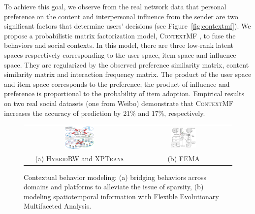 \documentclass[10.5pt]{article}
\begin{document}
To achieve this goal, we observe from the real network data that personal preference on the content and interpersonal influence from the sender are two significant factors that determine users' decisions (see Figure~\ref{fig:contextmf}). We propose a probabilistic matrix factorization model, \textsc{ContextMF} \cite{jiang2012socialcontextual}, to fuse the behaviors and social contexts. In this model, there are three low-rank latent spaces respectively corresponding to the user space, item space and influence space. They are regularized by the observed preference similarity matrix, content similarity matrix and interaction frequency matrix. The product of the user space and item space corresponds to the preference; the product of influence and preference is proportional to the probability of item adoption. Empirical results on two real social datasets (one from Weibo) demonstrate that \textsc{ContextMF} increases the accuracy of prediction by 21\% and 17\%, respectively.

\begin{figure}
\vskip -0.07in
\begin{tabular}{cc}
\includegraphics[width=0.27\textwidth]{figure/hybridrw-xptrans.pdf}
& \includegraphics[width=0.27\textwidth]{figure/fema.pdf} \\
(a) \textsc{HybridRW} and \textsc{XPTrans}
& (b) \textsc{FEMA}
\end{tabular}
\vskip -0.12in
\caption{Contextual behavior modeling: (a) bridging behaviors across domains and platforms to alleviate the issue of sparsity, (b) modeling spatiotemporal information with Flexible Evolutionary Multifaceted Analysis.}
\label{fig:fema}
\vskip -0.12in
\end{figure}
\end{document}
